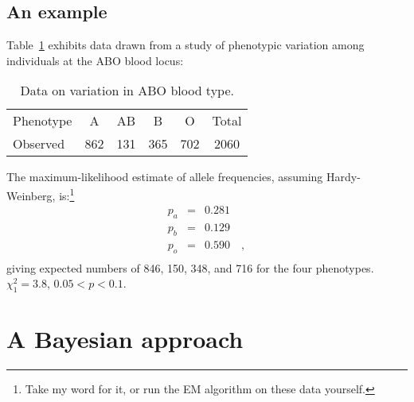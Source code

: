 \documentclass[12pt]{article}
\begin{document}
\subsection*{An example}

Table~\ref{table:abo-data} exhibits data drawn from a study of
phenotypic variation among individuals at the ABO blood locus:

\begin{table}
\begin{center}
\begin{tabular}{lccccc}
Phenotype &   A &  AB &   B &   O & Total \\
Observed  & 862 & 131 & 365 & 702 & 2060
\end{tabular}
\end{center}
\caption{Data on variation in ABO blood type.}\label{table:abo-data}
\end{table}
The maximum-likelihood estimate of allele frequencies,
assuming Hardy-Weinberg, is:\footnote{Take my word for it, or run the
  EM algorithm on these data yourself.}
\begin{eqnarray*}
p_a &=& 0.281 \\
p_b &=& 0.129 \\
p_o &=& 0.590 \quad , \\
\end{eqnarray*}
giving expected numbers of 846, 150, 348, and 716 for the
four phenotypes. $\chi^2_1 = 3.8$, $0.05 < p < 0.1$.

\section*{A Bayesian approach}
\end{document}

